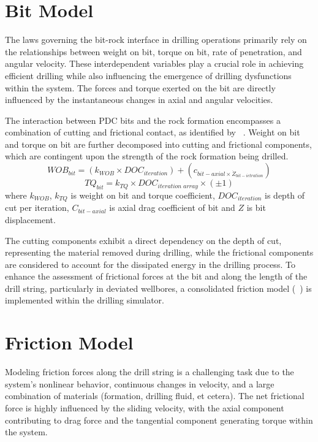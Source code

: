 \section{Bit Model}

The laws governing the bit-rock interface in drilling operations primarily rely on the relationships between weight on bit, torque on bit, rate of penetration, and angular velocity. These interdependent variables play a crucial role in achieving efficient drilling while also influencing the emergence of drilling dysfunctions within the system. The forces and torque exerted on the bit are directly influenced by the instantaneous changes in axial and angular velocities.

The interaction between PDC bits and the rock formation encompasses a combination of cutting and frictional contact, as identified by ~\cite{ref:detournay1992a}. Weight on bit and torque on bit are further decomposed into cutting and frictional components, which are contingent upon the strength of the rock formation being drilled.
\begin{equation}\label{WOB}
  WOB_{bit} = (k_{WOB}\times DOC_{iteration}) + (c_{bit-axial\times \dot{Z}_{bit-ietration}})
\end{equation}
\begin{equation}\label{Torque}
  TQ_{bit} = k_{TQ}\times DOC_{iteration\; array}\times (\pm1)
\end{equation}
where $k_{WOB}$, $k_{TQ}$ is weight on bit and torque coefficient, $DOC_{iteration}$ is depth of cut per iteration, $C_{bit-axial}$ is axial drag coefficient of bit and $Z$ is bit displacement.

The cutting components exhibit a direct dependency on the depth of cut, representing the material removed during drilling, while the frictional components are considered to account for the dissipated energy in the drilling process. To enhance the assessment of frictional forces at the bit and along the length of the drill string, particularly in deviated wellbores, a consolidated friction model (~\cite{ref:cayeux2020a}) is implemented within the drilling simulator.

\section{Friction Model}
Modeling friction forces along the drill string is a challenging task due to the system's nonlinear behavior, continuous changes in velocity, and a large combination of materials (formation, drilling fluid, et cetera). The net frictional force is highly influenced by the sliding velocity, with the axial component contributing to drag force and the tangential component generating torque within the system.
 
